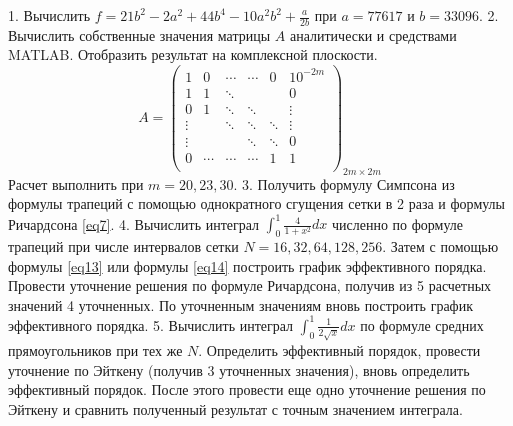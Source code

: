 1. Вычислить $f = 21b^2 - 2a^2 + 44b^4 - 10a^2b^2 + \frac{a}{2b}$ при $a = 77617$ и $b = 33096$.
2. Вычислить собственные значения матрицы $A$ аналитически и средствами MATLAB. Отобразить результат на комплексной плоскости.
\begin{equation} 
A = 
\begin{pmatrix}
1 & 0 & \cdots & \cdots & 0 & 10^{-2m} \\
1 & 1 & \ddots &  &  & 0 \\
0 & 1 & \ddots &  \ddots &  & \vdots \\
\vdots &  & \ddots & \ddots & \ddots & \vdots \\
\vdots &  &  & \ddots & \ddots  & 0 \\
0 & \cdots & \cdots &  \cdots & 1 & 1 \\
\end{pmatrix}_{2m \times 2m}
\end{equation}
Расчет выполнить при $m = 20,23,30$.
3. Получить формулу Симпсона из формулы трапеций с помощью однократного сгущения сетки в 2 раза и формулы Ричардсона \eqref{eq7}.
4. Вычислить интеграл $\int_{0}^{1} \frac{4}{1 + x^2} dx$ численно по формуле трапеций при числе интервалов сетки $N = 16,32,64,128,256$. Затем с помощью формулы \eqref{eq13} или формулы \eqref{eq14} построить график эффективного порядка. Провести уточнение решения по формуле Ричардсона, получив из 5 расчетных значений 4 уточненных. По уточненным значениям вновь построить график эффективного порядка.
5. Вычислить интеграл $\int_{0}^{1} \frac{1}{2 \sqrt{x}} dx$ по формуле средних прямоугольников при тех же $N$. Определить эффективный порядок, провести уточнение по Эйткену (получив 3 уточненных значения), вновь определить эффективный порядок. После этого провести еще одно уточнение решения по Эйткену и сравнить полученный результат с точным значением интеграла.
